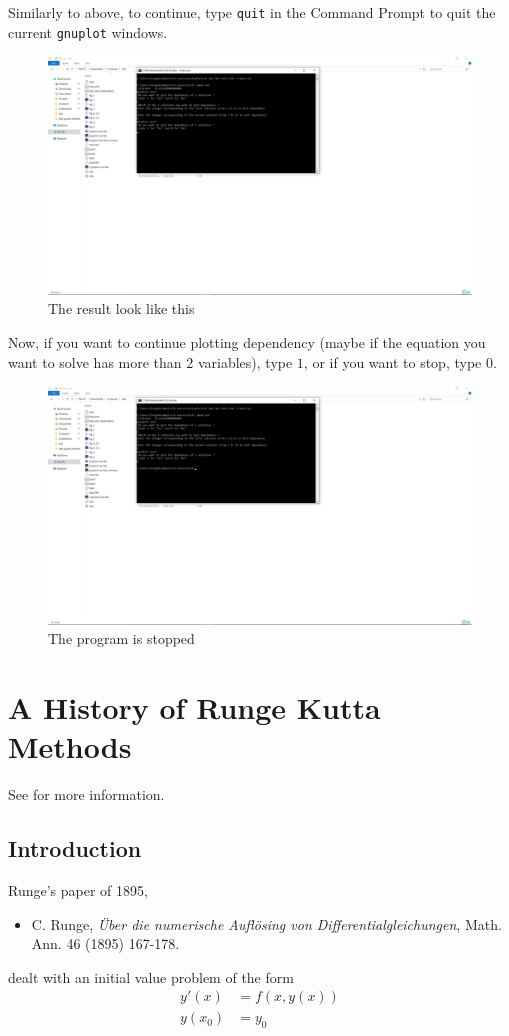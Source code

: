 \documentclass[a4paper,oneside]{book}
\numberwithin{equation}{chapter}
\begin{document}
	\noindent Similarly to above, to continue, type \texttt{quit} in the Command Prompt to quit the current \texttt{gnuplot} windows.
	\begin{figure}[H]
		\centering	\includegraphics[width=15cm]{wfig101}
		\caption{The result look like this}
	\end{figure}
	\noindent Now, if you want to continue plotting dependency (maybe if the equation you want to solve has more than $2$ variables), type $1$, or if you want to stop, type $0$.
	\begin{figure}[H]
		\centering	\includegraphics[width=15cm]{wfig11}
		\caption{The program is stopped}
	\end{figure}

\chapter{A History of Runge Kutta Methods}
See \cite{history} for more information.
\section{Introduction}
Runge's paper of 1895, 
\begin{itemize}
\item C. Runge, \textit{\"{U}ber die numerische Aufl\"{o}sing von Differentialgleichungen}, Math. Ann. 46 (1895) 167-178.
\end{itemize}
dealt with an initial value problem of the form
\begin{align}
y'\left( x \right) &= f\left( {x,y\left( x \right)} \right)\\
y\left( {{x_0}} \right) &= {y_0}
\end{align}
\end{document}
